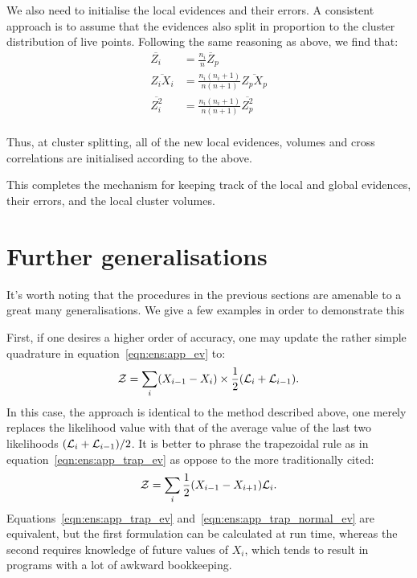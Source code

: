 We also need to initialise the local evidences and their errors. A consistent approach is to assume that the evidences also split in proportion to the cluster distribution of live points. Following the same reasoning as above, we find that:
\begin{align}
  \overline{Z_i}&=  \frac{n_i}{n} \overline Z_p \\
  \overline{Z_i X_i}&= \frac{n_i(n_i+1)}{n(n+1)} \overline{Z_p X_p} \\
  \overline{Z_i^2}  &= \frac{n_i(n_i+1)}{n(n+1)} \overline{Z_p^2} \\
\end{align}

Thus, at cluster splitting, all of the new local evidences, volumes and cross correlations are initialised according to the above.

This completes the mechanism for keeping track of the local and global evidences, their errors, and the local cluster volumes.


\section{Further generalisations}

It's worth noting that the procedures in the previous sections are amenable to a great many generalisations. We give a few examples in order to demonstrate this

First, if one desires a higher order of accuracy, one may update the rather simple quadrature in equation~\eqref{eqn:ens:app_ev} to:
\begin{equation}
  \mathcal{Z} = \sum\limits_{i} (X_{i-1}-X_{i}) \times \frac{1}{2}(\mathcal{L}_i+\mathcal{L}_{i-1}).
  \label{eqn:ens:app_trap_ev}
\end{equation}
In this case, the approach is identical to the method described above, one merely replaces the likelihood value with that of the average value of the last two likelihoods $(\mathcal{L}_i + \mathcal{L}_{i-1})/2$.
It is better to phrase the trapezoidal rule as in equation~\eqref{eqn:ens:app_trap_ev} as oppose to the more traditionally cited:
\begin{equation}
  \mathcal{Z} = \sum\limits_{i} \frac{1}{2}(X_{i-1}-X_{i+1}) \mathcal{L}_i.
  \label{eqn:ens:app_trap_normal_ev}
\end{equation}
Equations~\eqref{eqn:ens:app_trap_ev} and~\eqref{eqn:ens:app_trap_normal_ev} are equivalent, but the first formulation can be calculated at run time, whereas the second requires knowledge of future values of $X_{i}$, which tends to result in programs with a lot of awkward bookkeeping.

